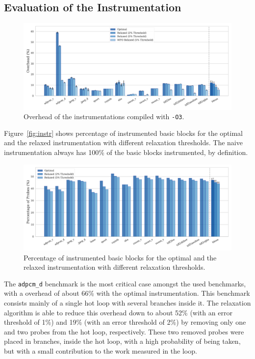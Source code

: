 \documentclass[sigplan,10pt]{acmart}
\begin{document}
\subsection{Evaluation of the Instrumentation}

\begin{figure}[htp]
    \centering
    \includegraphics[width=\textwidth]{figs/overhead-O3.pdf}
    \caption{Overhead of the instrumentations compiled with {\texttt{-O3}}.}
    \label{fig:overhead-O3}
\end{figure}

Figure~\ref{fig:instr} shows percentage of instrumented basic blocks for the optimal and the relaxed instrumentation with different relaxation thresholds.
The naive instrumentation always has 100\% of the basic blocks instrumented, by definition.

\begin{figure}[htp]
    \centering
    \includegraphics[width=\textwidth]{figs/num-probes.pdf}
    \caption{Percentage of instrumented basic blocks for the optimal and the relaxed instrumentation with different relaxation thresholds.}
    \label{fig:num-probes}
\end{figure}

The \texttt{adpcm\_d} benchmark is the most critical case amongst the used benchmarks, with a overhead of about 66\% with the optimal instrumentation.
This benchmark consists mainly of a single hot loop with several branches inside it.
The relaxation algorithm is able to reduce this overhead down to about 52\% (with an error threshold of 1\%) and 19\% (with an error threshold of 2\%) by removing only one and two probes from the hot loop, respectively.
These two removed probes were placed in branches, inside the hot loop, with a high probability of being taken, but with a small contribution to the work measured in the loop.
\end{document}
